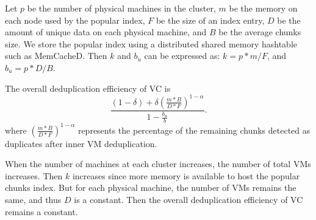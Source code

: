 Let $p$ be the number of physical machines in the cluster, $m$ be the memory on each node used by the popular
index, $F$ be the size of an index entry,
$D$ be the amount of unique data on each physical machine, and 
$B$ be the average chunks size. We store the popular index using a distributed shared memory hashtable
such as MemCacheD.  Then $k$ and $b_u$ can be expressed as:
$
k = p*m/F$, and $b_u = p*D/B.
$

The overall deduplication efficiency of VC is
\[
\frac{ (1-\delta) + \delta (\frac{m*B}{D*F})^{1-\alpha}}
{ 1- \frac{b_u}{b} }.
\]
where $(\frac{m*B}{D*F})^{1-\alpha}$ represents the percentage of the remaining chunks detected as duplicates
after inner VM deduplication. 

When the number of machines at each cluster increases, the number of total VMs increases.
Then $k$ increases since more memory is available to host the popular chunks index.
But for each physical machine, the number of VMs remains the same, and thus
$D$ is  a constant. Then  the overall deduplication efficiency of VC remains
a constant.







